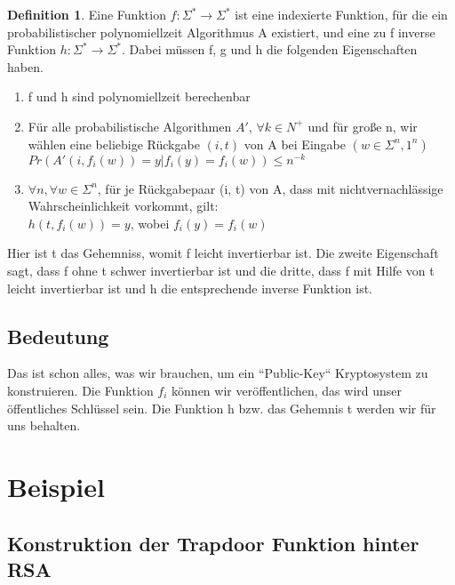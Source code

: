 \documentclass[12pt,a4paper]{article}
\theoremstyle{definition}
\newtheorem{definition}[theorem]{Definition}
\begin{document}
    \begin{definition}
        Eine Funktion $f: \Sigma^* \longrightarrow \Sigma^*$ ist eine indexierte Funktion, für die ein
        probabilistischer polynomiellzeit Algorithmus A
        existiert, und eine zu f inverse Funktion $h: \Sigma^* \longrightarrow \Sigma^*$.
        Dabei müssen f, g und h die folgenden Eigenschaften haben.
        \begin{enumerate}
            \item f und h sind polynomiellzeit berechenbar
            \item Für alle probabilistische Algorithmen $A'$, $\forall k \in N^+$ und für große n, wir wählen eine
            beliebige Rückgabe $(i, t)$ von A bei Eingabe $(w \in \Sigma^n, 1^n)$ \\
            $Pr(A'(i, f_i(w)) = y | f_i(y) = f_i(w)) \leq n^{-k}$
            \item $\forall n, \forall w \in \Sigma^n$, für je Rückgabepaar (i, t) von A, dass mit nichtvernachlässige
            Wahrscheinlichkeit vorkommt, gilt: \\
            $h(t, f_i(w)) = y$, wobei $f_i(y) = f_i(w)$
        \end{enumerate}
    \end{definition}

    Hier ist t das Gehemniss, womit f leicht invertierbar ist. Die zweite Eigenschaft sagt, dass f ohne t schwer
    invertierbar ist und die dritte, dass f mit Hilfe von t leicht invertierbar ist und h die entsprechende
    inverse Funktion ist.

    \subsection{Bedeutung}

    Das ist schon alles, was wir brauchen, um ein ``Public-Key`` Kryptosystem zu konstruieren. Die Funktion $f_i$
    können wir veröffentlichen, das wird unser öffentliches Schlüssel sein. Die Funktion h bzw. das Gehemnis t werden
    wir für uns behalten.

    \section{Beispiel}

    \subsection{Konstruktion der Trapdoor Funktion hinter RSA}
\end{document}
